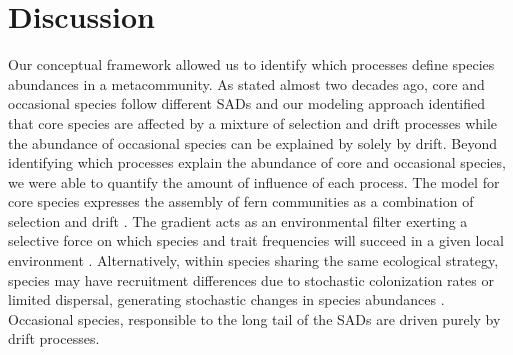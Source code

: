 \documentclass[12pt]{article}
\begin{document}

\section*{Discussion}



Our conceptual framework allowed us to identify which processes define species abundances in a metacommunity. As \cite{Magurran2003} stated almost two decades ago, core and occasional species follow different SADs and our modeling approach identified that core species are affected by a mixture of selection and drift processes while the abundance of occasional species can be explained by solely by drift. Beyond identifying which processes explain the abundance of core and occasional species, we were able to quantify the amount of influence of each process. The model for core species expresses the assembly of fern communities as a combination of selection and drift \citep{Vellend2010}. The gradient acts as an environmental filter exerting a selective force on which species and trait frequencies will succeed in a given local environment \citep{Webb2010}.  Alternatively, within species sharing the same ecological strategy, species may have recruitment differences due to stochastic colonization rates or limited dispersal, generating stochastic changes in species abundances \citep{Gravel2006, Weiher2011}. Occasional species, responsible to the long tail of the SADs are driven purely by drift processes. %
\end{document}
